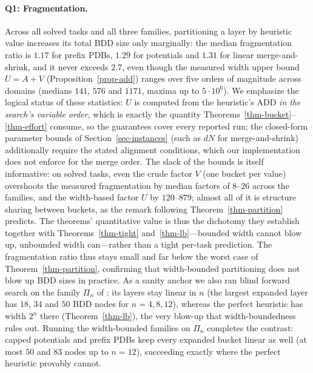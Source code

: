 \documentclass[letterpaper]{article}
\newcommand{\task}{\ensuremath{\Pi}}
\newcommand{\values}{\ensuremath{V}}
\theoremstyle{plain}
\theoremstyle{definition}
\theoremstyle{remark}
\begin{document}
\paragraph{Q1: Fragmentation.}
Across all solved tasks and all three families, partitioning a layer by
heuristic value increases its total BDD size only marginally: the median
fragmentation ratio is $1.17$ for prefix PDBs, $1.29$ for potentials and
$1.31$ for linear merge-and-shrink, and it never exceeds $2.7$, even
though the measured width upper bound $U = A + \values$
(Proposition~\ref{prop-add}) ranges over five orders of magnitude across
domains (medians $141$, $576$ and $1171$, maxima up to $5{\cdot}10^{6}$).
We emphasize the logical status of these statistics: $U$ is computed
from the heuristic's ADD \emph{in the search's variable order}, which is
exactly the quantity Theorems~\ref{thm-bucket}--\ref{thm-effort}
consume, so the guarantees cover every reported run; the closed-form
parameter bounds of Section~\ref{sec-instances} (such as $dN$ for
merge-and-shrink) additionally require the stated alignment conditions,
which our implementation does not enforce for the merge order. The slack of the bounds is itself informative: on solved
tasks, even the crude factor $\values$ (one bucket per value) overshoots
the measured fragmentation by median factors of $8$--$26$ across the
families, and the width-based factor $U$ by $120$--$879$; almost all of
it is structure sharing between buckets, as the remark following
Theorem~\ref{thm-partition} predicts. The theorems' quantitative value
is thus the dichotomy they establish together with
Theorems~\ref{thm-tight} and~\ref{thm-lb}---bounded width cannot blow up,
unbounded width can---rather than a tight per-task prediction.
The fragmentation ratio thus stays small and far below the worst case of
Theorem~\ref{thm-partition}, confirming that width-bounded partitioning
does not blow up BDD sizes in practice. As a sanity anchor we also ran
blind forward search on the family $\task_n$ of
\citet{speck-et-al-icaps2020}: its layers stay linear in $n$ (the largest
expanded layer has $18$, $34$ and $50$ BDD nodes for $n = 4, 8, 12$),
whereas the perfect heuristic has width $2^{n}$ there
(Theorem~\ref{thm-lb}), the very blow-up that width-boundedness rules out. Running the width-bounded families on $\task_n$ completes the
contrast: capped potentials and prefix PDBs keep every expanded bucket
linear as well (at most $50$ and $83$ nodes up to $n = 12$), succeeding
exactly where the perfect heuristic provably cannot.
\end{document}
